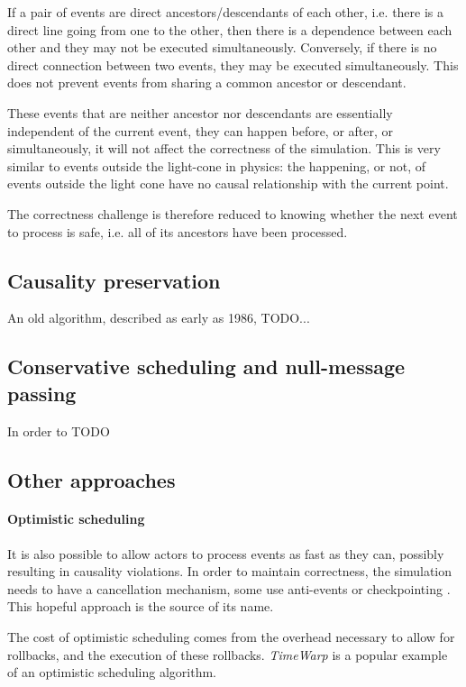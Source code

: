 If a pair of events are direct ancestors/descendants of each other, i.e. there is a direct line going from one to the other, then there is a dependence between each other and they may not be executed simultaneously.
Conversely, if there is no direct connection between two events, they may be executed simultaneously.
This does not prevent events from sharing a common ancestor or descendant.

These events that are neither ancestor nor descendants are essentially independent of the current event, they can happen before, or after, or simultaneously, it will not affect the correctness of the simulation.
This is very similar to events outside the light-cone in physics: the happening, or not, of events outside the light cone have no causal relationship with the current point.

The correctness challenge is therefore reduced to knowing whether the next event to process is safe, i.e. all of its ancestors have been processed.

\subsection{Causality preservation} \label{causality}

An old algorithm, described as early as 1986\cite{misra_distributed_1986}, TODO...

\subsection{Conservative scheduling and null-message passing} \label{null-messages}

In order to TODO

\subsection{Other approaches}
\paragraph{Optimistic scheduling} \label{optimistic-scheduling}

It is also possible to allow actors to process events as fast as they can, possibly resulting in causality violations.
In order to maintain correctness, the simulation needs to have a cancellation mechanism, some use anti-events \cite{} or checkpointing \cite{}. %
This hopeful approach is the source of its name.

The cost of optimistic scheduling comes from the overhead necessary to allow for rollbacks, and the execution of these rollbacks.
\emph{TimeWarp} \cite{} is a popular example of an optimistic scheduling algorithm.

